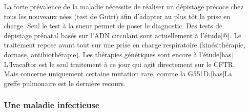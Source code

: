 \documentclass[12pt,a4paper]{article}
\begin{document}
La forte prévalence de la maladie nécessite de réaliser un dépistage précoce chez tous les nouveaux nées (test de Gutri) afin d’adapter au plus tôt la prise en charge. Seul le test à la sueur permet de poser le diagnostic. Des tests de dépistage prénatal basés sur l’ADN circulant sont actuellement à l’étude[@]. Le traitement repose avant tout sur une prise en charge respiratoire (kinésithérapie, dornase, antibiothérapie).
Les thérapies génétiques sont encore à l’étude[has]
L’Ivacaftor est le seul traitement à ce jour qui agit directement sur le CFTR. Mais concerne uniquement certaine mutation rare, comme la G551D.[has]La greffe pulmonaire est le dernière recours.

\subsubsection{Une maladie infectieuse}
\end{document}

